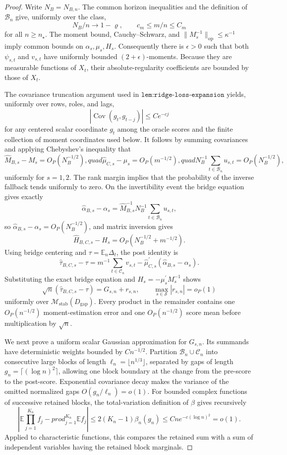 \documentclass{article}
\begin{document}
\begin{proof}
Write \(N_B=N_{B,n}\).  The common horizon inequalities and the definition of \(\mathcal B_n\) give, uniformly over the class,
\[
 N_B/n\to1-\varrho,
 \qquad c_m\leq m/n\leq C_m
\]
for all \(n\geq n_\star\).  The moment bound, Cauchy--Schwarz, and \(\|M_s^{-1}\|_{\mathrm{op}}\leq\kappa^{-1}\) imply common bounds on \(\alpha_s,\mu_s,H_s\).  Consequently there is \(\epsilon>0\) such that both \(\psi_{s,t}\) and \(v_{s,t}\) have uniformly bounded \((2+\epsilon)\)-moments.  Because they are measurable functions of \(X_t\), their absolute-regularity coefficients are bounded by those of \(X_t\).

The covariance truncation argument used in \(\texttt{lem:ridge-loss-expansion}\) yields, uniformly over rows, roles, and lags,
\[
 |\operatorname{Cov}(g_t,g_{t-j})|\leq C e^{-cj}
\]
for any centered scalar coordinate \(g_t\) among the oracle scores and the finite collection of moment coordinates used below.  It follows by summing covariances and applying Chebyshev's inequality that
\[
 \widehat M_{B,s}-M_s=O_P(N_B^{-1/2}),quad
 \widehat\mu_{C,s}-\mu_s=O_P(m^{-1/2}),quad
 N_B^{-1}\sum_{t\in\mathcal B_n}u_{s,t}=O_P(N_B^{-1/2}),
\]
uniformly for \(s=1,2\).  The rank margin implies that the probability of the inverse fallback tends uniformly to zero.  On the invertibility event the bridge equation gives exactly
\[
 \widehat\alpha_{B,s}-\alpha_s
 =\widehat M_{B,s}^{-1}N_B^{-1}\sum_{t\in\mathcal B_n}u_{s,t},
\]
so \(\widehat\alpha_{B,s}-\alpha_s=O_P(N_B^{-1/2})\), and matrix inversion gives
\[
 \widehat H_{B,C,s}-H_s=O_P(N_B^{-1/2}+m^{-1/2}).
\]
Using bridge centering and \(\tau=\mathbb E_n\Delta_t\), the post identity is
\[
 \widehat\tau_{B,C,s}-\tau
 =m^{-1}\sum_{t\in\mathcal C_n}v_{s,t}
 -\widehat\mu_{C,s}^{\prime}(\widehat\alpha_{B,s}-\alpha_s).
\]
Substituting the exact bridge equation and \(H_s=-\mu_s^{\prime}M_s^{-1}\) shows
\[
 \sqrt n(\widehat\tau_{B,C,s}-\tau)=G_{s,n}+r_{s,n},
 \qquad
 \max_{s\in\mathcal S}|r_{s,n}|=o_P(1)
\]
uniformly over \(\mathcal M_{\mathrm{stab}}(D_{\mathrm{gap}})\).  Every product in the remainder contains one \(O_P(n^{-1/2})\) moment-estimation error and one \(O_P(n^{-1/2})\) score mean before multiplication by \(\sqrt n\).

We next prove a uniform scalar Gaussian approximation for \(G_{s,n}\).  Its summands have deterministic weights bounded by \(C n^{-1/2}\).  Partition \(\mathcal B_n\cup\mathcal C_n\) into consecutive large blocks of length \(\ell_n=\lfloor n^{1/3}\rfloor\), separated by gaps of length \(g_n=\lceil(\log n)^2\rceil\), allowing one block boundary at the change from the pre-score to the post-score.  Exponential covariance decay makes the variance of the omitted normalized gaps \(O(g_n/\ell_n)=o(1)\).  For bounded complex functions of successive retained blocks, the total-variation definition of \(\beta\) gives recursively
\[
 \left|\mathbb E\prod_{j=1}^{K_n}f_j-prod_{j=1}^{K_n}\mathbb Ef_j\right|
 \leq2(K_n-1)\beta_n(g_n)
 \leq Cn e^{-c(\log n)^2}=o(1).
\]
Applied to characteristic functions, this compares the retained sum with a sum of independent variables having the retained block marginals.


\end{proof}
\end{document}

